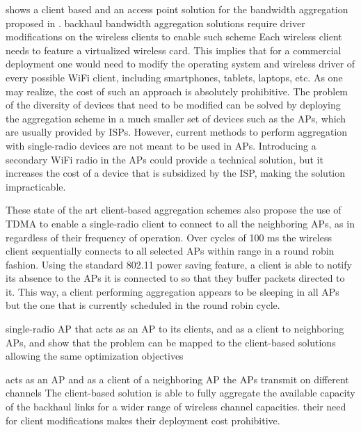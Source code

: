  shows a client based and an access point solution for the bandwidth aggregation proposed in \cite{goma2013patent}.
backhaul bandwidth aggregation solutions require driver modifications on the wireless clients to enable such scheme
Each wireless client needs to feature a virtualized wireless card.
This implies that for a commercial deployment one would need to modify the operating system and wireless driver of every possible WiFi client, including smartphones, tablets, laptops, etc. As one may realize, the cost of such an approach is absolutely prohibitive.
The problem of the diversity of devices that need to be modified can be solved
by deploying the aggregation scheme in a much smaller set of devices such as the
APs, which are usually provided by ISPs. However, current methods to perform aggregation with single-radio devices are not meant to be used in APs.
Introducing a secondary WiFi radio in the APs could provide a technical solution, but it increases the cost of a device that is subsidized by the ISP, making the solution impracticable.

These state of the art client-based aggregation schemes also propose the use
of TDMA to enable a single-radio client to connect to all the neighboring APs, as in  regardless of their frequency of operation. Over cycles of 100 ms the wireless client sequentially connects to all selected APs within range in a round robin fashion. Using the standard 802.11 power saving feature, a client is able to notify its absence to the APs it is connected to so that they buffer packets directed to it. This way, a client performing aggregation appears to be sleeping in all APs but the one that is currently scheduled in the round robin cycle.

single-radio AP that acts as an AP to its clients, and as a client to neighboring APs, and show that the problem can be mapped to the client-based solutions allowing the same optimization objectives

acts as an AP and as a client of a neighboring AP
the APs transmit on different channels
The client-based solution is able to fully aggregate the available capacity of the
backhaul links for a wider range of wireless channel capacities.
their need for client modifications makes their deployment cost prohibitive.

